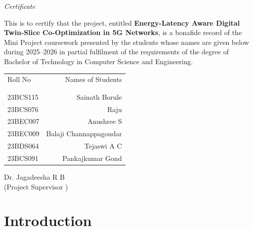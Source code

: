 \documentclass[12pt]{article}
\begin{document}
\newpage
\thispagestyle{empty}
\clearpage
\thispagestyle{empty}
\phantom{a}
\newpage
\thispagestyle{empty}

\begin{center}
	
	\emph{\huge{Certificate}}\\[2.5cm]
\end{center}
\normalsize This is to certify that the project, entitled \textbf{Energy-Latency Aware Digital Twin-Slice Co-Optimization in 5G Networks}, is a bonafide record of the Mini Project coursework presented by the students whose names are given below during 2025--2026 in partial fulfilment of the requirements of the degree of Bachelor of Technology in Computer Science and Engineering.\\[1.0cm]

\begin{table}[h]
	\centering
	\begin{tabular}{lr}
		Roll No & Names of Students \\ \\ \hline
		\\
		23BCS115 & Sainath Borule \\ 
		23BCS076 & Raju \\ 
		23BEC007 & Anushree S \\
		23BEC009 & Balaji Channappagoudar \\
		23BDS064 & Tejaswi A C \\ 
		23BCS091 & Pankajkumar Gond \\ 
	\end{tabular}
\end{table}

\vfill

\begin{flushright}
	Dr. Jagadeesha R B\\
	(Project Supervisor )\\[1.5cm]
\end{flushright}

\newpage
{}
\setcounter{page}{1}
\tableofcontents
\newpage
\listoffigures
\newpage
\listoftables


\newpage
\thispagestyle{empty}
\clearpage
\thispagestyle{empty}
\phantom{a}
\newpage



\section{Introduction}
\end{document}
